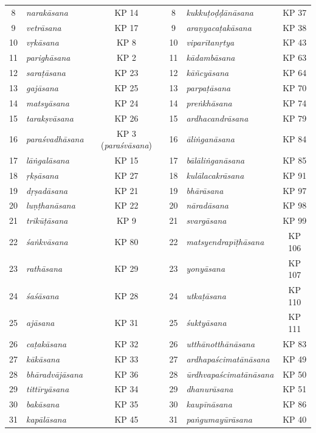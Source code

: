 \begin{longtable}{clcclc}
8 & \emph{narakāsana} & KP 14 & 8 & \emph{kukkuṭoḍḍānāsana} & KP 37 \\
9 & \emph{vetrāsana} & KP 17 & 9 & \emph{araṇyacaṭakāsana} & KP 38 \\
10 & \emph{vṛkāsana} & KP 8 & 10 & \emph{viparītanṛtya} & KP 43 \\
11 & \emph{parighāsana} & KP 2 & 11 & \emph{kādambāsana} & KP 63 \\
12 & \emph{saraṭāsana} & KP 23 & 12 & \emph{kāñcyāsana} & KP 64 \\
13 & \emph{gajāsana} & KP 25 & 13 & \emph{parpaṭāsana} & KP 70 \\
14 & \emph{matsyāsana} & KP 24 & 14 & \emph{preṅkhāsana} & KP 74 \\
15 & \emph{tarakṣvāsana} & KP 26 & 15 & \emph{ardhacandrāsana} & KP 79 \\
16 & \emph{paraśvadhāsana} & KP 3 (\emph{paraśvāsana}) & 16 & \emph{āliṅganāsana} & KP 84 \\
17 & \emph{lāṅgalāsana} & KP 15 & 17 & \emph{bālāliṅganāsana} & KP 85 \\
18 & \emph{ṛkṣāsana} & KP 27 & 18 & \emph{kulālacakrāsana} & KP 91 \\
19 & \emph{dṛṣadāsana} & KP 21 & 19 & \emph{bhārāsana} & KP 97 \\
20 & \emph{luṇṭhanāsana} & KP 22 & 20 & \emph{nāradāsana} & KP 98 \\
21 & \emph{trikūṭāsana} & KP 9 & 21 & \emph{svargāsana} & KP 99 \\
22 & \emph{śaṅkvāsana} & KP 80 & 22 & \emph{matsyendrapīṭhāsana} & KP 106 \\
23 & \emph{rathāsana} & KP 29 & 23 & \emph{yonyāsana} & KP 107 \\
24 & \emph{śaśāsana} & KP 28 & 24 & \emph{utkaṭāsana} & KP 110 \\
25 & \emph{ajāsana} & KP 31 & 25 & \emph{śuktyāsana} & KP 111 \\
26 & \emph{caṭakāsana} & KP 32 & 26 & \emph{utthānotthānāsana} & KP 83 \\
27 & \emph{kākāsana} & KP 33 & 27 & \emph{ardhapaścimatānāsana} & KP 49 \\
28 & \emph{bhāradvājāsana} & KP 36 & 28 & \emph{ūrdhvapaścimatānāsana} & KP 50 \\
29 & \emph{tittīryāsana} & KP 34 & 29 & \emph{dhanurāsana} & KP 51 \\
30 & \emph{bakāsana} & KP 35 & 30 & \emph{kaupīnāsana} & KP 86 \\
31 & \emph{kapālāsana} & KP 45 & 31 & \emph{paṅgumayūrāsana} & KP 40 \\

\end{longtable}
